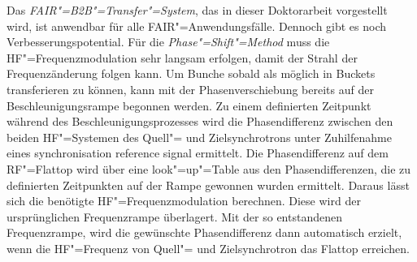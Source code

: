 Das \textit{FAIR"=B2B"=Transfer"=System}, das in dieser Doktorarbeit vorgestellt wird, ist anwendbar f\"ur alle FAIR"=Anwendungsf\"alle. Dennoch gibt es noch Verbesserungspotential. F\"ur die \textit{\textit{Phase"=Shift"=Method}} muss die HF"=Frequenzmodulation sehr langsam erfolgen, damit der Strahl der Frequenz\"anderung folgen kann. Um Bunche sobald als m\"oglich in Buckets transferieren zu k\"onnen, kann mit der Phasenverschiebung bereits auf der Beschleunigungsrampe begonnen werden. Zu einem definierten Zeitpunkt w\"ahrend des Beschleunigungsprozesses wird die Phasendifferenz zwischen den beiden HF"=Systemen des Quell"= und Zielsynchrotrons unter Zuhilfenahme eines synchronisation reference signal ermittelt. Die Phasendifferenz auf dem RF"=Flattop wird \"uber eine look"=up"=Table aus den Phasendifferenzen, die zu definierten Zeitpunkten auf der Rampe gewonnen wurden ermittelt. Daraus l\"asst sich die ben\"otigte HF"=Frequenzmodulation berechnen. Diese wird der urspr\"unglichen Frequenzrampe \"uberlagert. Mit der so entstandenen Frequenzrampe, wird die gew\"unschte Phasendifferenz dann automatisch erzielt, wenn die HF"=Frequenz von Quell"= und Zielsynchrotron das Flattop erreichen.